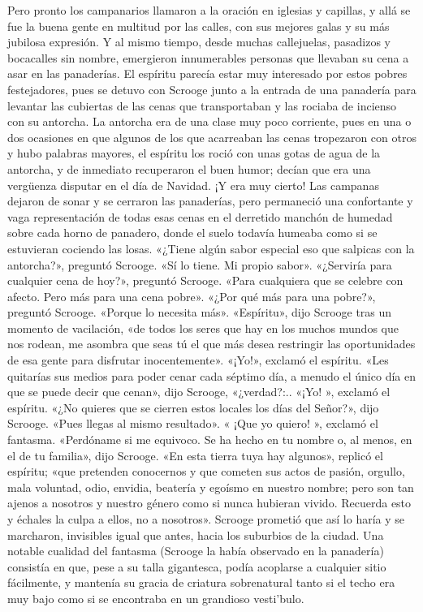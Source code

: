 \documentclass{novela}
\begin{document}
 Pero pronto los campanarios llamaron a la oración en iglesias y capillas, y allá se fue la buena gente en multitud por las calles, con sus mejores galas y su más jubilosa expresión. Y al mismo tiempo, desde muchas callejuelas, pasadizos y bocacalles sin nombre, emergieron innumerables personas que llevaban su cena a asar en las panaderías. El espíritu parecía estar muy interesado por estos pobres festejadores, pues se detuvo con Scrooge junto a la entrada de una panadería para levantar las cubiertas de las cenas que transportaban y las rociaba de incienso con su antorcha. La antorcha era de una clase muy poco corriente, pues en una o dos ocasiones en que algunos de los que acarreaban las cenas tropezaron con otros y hubo palabras mayores, el espíritu los roció con unas gotas de agua de la antorcha, y de inmediato recuperaron el buen humor; decían que era una vergüenza disputar en el día de Navidad. ¡Y era muy cierto!
 Las campanas dejaron de sonar y se cerraron las panaderías, pero permaneció una confortante y vaga representación de todas esas cenas en el derretido manchón de humedad sobre cada horno de panadero, donde el suelo todavía humeaba como si se estuvieran cociendo las losas.
 «¿Tiene algún sabor especial eso que salpicas con la antorcha?», preguntó Scrooge.
 «Sí lo tiene. Mi propio sabor».
 «¿Serviría para cualquier cena de hoy?», preguntó Scrooge.
 «Para cualquiera que se celebre con afecto. Pero más para una cena pobre».
 «¿Por qué más para una pobre?», preguntó Scrooge.
 «Porque lo necesita más».
 «Espíritu», dijo Scrooge tras un momento de vacilación, «de todos los seres que hay en los muchos mundos que nos rodean, me asombra que seas tú el que más desea restringir las oportunidades de esa gente para disfrutar inocentemente».
 «¡Yo!», exclamó el espíritu.
 «Les quitarías sus medios para poder cenar cada séptimo día, a menudo el único día en que se puede decir que cenan», dijo Scrooge, «¿verdad?:..
 «¡Yo! », exclamó el espíritu.
 «¿No quieres que se cierren estos locales los días del Señor?», dijo Scrooge. «Pues llegas al mismo resultado».
 « ¡Que yo quiero! », exclamó el fantasma.
 «Perdóname si me equivoco. Se ha hecho en tu nombre o, al menos, en el de tu familia», dijo Scrooge.
 «En esta tierra tuya hay algunos», replicó el espíritu; «que pretenden conocernos y que cometen sus actos de pasión, orgullo, mala voluntad, odio, envidia, beatería y egoísmo en nuestro nombre; pero son tan ajenos a nosotros y nuestro género como si nunca hubieran vivido. Recuerda esto y échales la culpa a ellos, no a nosotros».
 Scrooge prometió que así lo haría y se marcharon, invisibles igual que antes, hacia los suburbios de la ciudad. Una notable cualidad del fantasma (Scrooge la había observado en la panadería) consistía en que, pese a su talla gigantesca, podía acoplarse a cualquier sitio fácilmente, y mantenía su gracia de criatura sobrenatural tanto si el techo era muy bajo como si se encontraba en un grandioso vesti'bulo.
\end{document}
